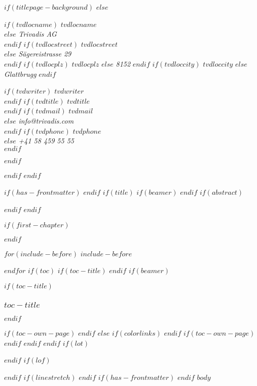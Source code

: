\documentclass[
$if(fontsize)$
  $fontsize$,
$endif$
$if(lang)$
  $babel-lang$,
$endif$
$if(papersize)$
  $papersize$paper,
$else$
  a4paper,
$endif$
$if(beamer)$
  ignorenonframetext,
  $if(handout)$
    handout,
  $endif$
  $if(aspectratio)$
    aspectratio=$aspectratio$,
  $endif$
$endif$
$for(classoption)$
  $classoption$$sep$,
$endfor$
,tablecaptionabove
]{$if(beamer)$$documentclass$$else$$if(book)$scrbook$else$scrartcl$endif$$endif$}
\begin{document}
\begin{titlepage}
\begin{flushleft}

$if(titlepage-background)$
$else$
  \begin{flushright}
    $if(tvdlocname)$ \textit{$tvdlocname$\\}  $else$ \textit{Trivadis AG\\} $endif$
    $if(tvdlocstreet)$ \textit{$tvdlocstreet$\\}  $else$ \textit{Sägereistrasse 29\\} $endif$
    $if(tvdlocplz)$ \textit{$tvdlocplz$}  $else$ \textit{8152} $endif$
    $if(tvdloccity)$ \textit{$tvdloccity$}  $else$ \textit{Glattbrugg} $endif$
    \par
  \end{flushright}

  \begin{flushright}
    $if(tvdwriter)$ \textit{$tvdwriter$\\} $endif$
    $if(tvdtitle)$ \textit{$tvdtitle$\\} $endif$
    $if(tvdmail)$ \textit{$tvdmail$\\}  $else$ \textit{info@trivadis.com\\} $endif$
    $if(tvdphone)$ \textit{$tvdphone$\\}  $else$ \textit{+41 58 459 55 55\\} $endif$
  \end{flushright}
$endif$
\end{flushleft}
\end{titlepage}
  \restoregeometry
$endif$
$endif$


$if(has-frontmatter)$
\frontmatter
$endif$
$if(title)$
  $if(beamer)$
    \frame{\titlepage}
  $endif$
  $if(abstract)$
    \begin{abstract}
      $abstract$
    \end{abstract}
  $endif$
$endif$

$if(first-chapter)$
\setcounter{chapter}{$first-chapter$}
\addtocounter{chapter}{-1}
$endif$

$for(include-before)$
  $include-before$

$endfor$
$if(toc)$
  $if(toc-title)$
    \renewcommand*\contentsname{$toc-title$}
  $endif$
  $if(beamer)$
    \begin{frame}
      $if(toc-title)$
        \frametitle{$toc-title$}
      $endif$
      \tableofcontents[hideallsubsections]
    \end{frame}
    $if(toc-own-page)$
      \newpage
    $endif$
  $else$
    {
      $if(colorlinks)$
        \hypersetup{linkcolor=$if(toccolor)$$toccolor$$else$$endif$}
      $endif$
      \setcounter{tocdepth}{$if(toc-depth)$$toc-depth$$else$3$endif$}
      \tableofcontents
      $if(toc-own-page)$
        \newpage
      $endif$
    }
  $endif$
$endif$
$if(lot)$
  \listoftables
$endif$
$if(lof)$
  \listoffigures
$endif$
$if(linestretch)$
$endif$
$if(has-frontmatter)$
  \mainmatter
$endif$
$body$
\end{document}

